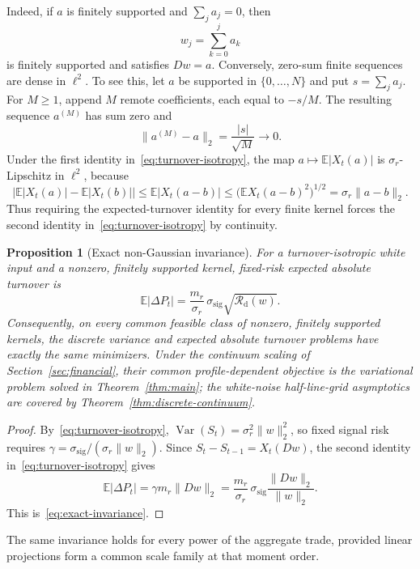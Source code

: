 \documentclass[11pt]{article}
\newtheorem{proposition}[theorem]{Proposition}
\theoremstyle{definition}
\theoremstyle{remark}
\newcommand{\Rcal}{\mathcal R}
\begin{document}
Indeed, if $a$ is finitely supported and $\sum_ja_j=0$, then
\[
 w_j=\sum_{k=0}^j a_k
\]
is finitely supported and satisfies $Dw=a$. Conversely, zero-sum finite
sequences are dense in $\ell^2$. To see this, let $a$ be supported in
$\{0,\dots,N\}$ and put $s=\sum_ja_j$. For $M\geq1$, append $M$ remote
coefficients, each equal to $-s/M$. The resulting sequence $a^{(M)}$ has sum
zero and
\[
 \|a^{(M)}-a\|_2=\frac{|s|}{\sqrt M}\longrightarrow0.
\]
Under the first
identity in~\eqref{eq:turnover-isotropy}, the map
$a\mapsto\mathbb E|X_t(a)|$ is $\sigma_r$-Lipschitz in $\ell^2$, because
\[
 \bigl|\mathbb E|X_t(a)|-\mathbb E|X_t(b)|\bigr|
 \leq\mathbb E|X_t(a-b)|
 \leq\bigl(\mathbb E X_t(a-b)^2\bigr)^{1/2}
 =\sigma_r\|a-b\|_2.
\]
Thus requiring
the expected-turnover identity for every finite kernel forces the second
identity in~\eqref{eq:turnover-isotropy} by continuity.

\begin{proposition}[Exact non-Gaussian invariance]\label{prop:exact-invariance}
For a turnover-isotropic white input and a nonzero, finitely supported kernel,
fixed-risk expected absolute turnover is
\begin{equation}\label{eq:exact-invariance}
 \mathbb E|\Delta P_t|
 =\frac{m_r}{\sigma_r}\,\sigma_{\mathrm{sig}}
     \sqrt{\Rcal_{\mathrm d}(w)}.
\end{equation}
Consequently, on every common feasible class of nonzero, finitely supported
kernels, the discrete variance and expected absolute turnover problems have
exactly the same minimizers. Under the continuum scaling of
Section~\ref{sec:financial},
their common profile-dependent objective is the variational problem solved in
Theorem~\ref{thm:main}; the white-noise
half-line-grid asymptotics are covered by
Theorem~\ref{thm:discrete-continuum}.
\end{proposition}
\begin{proof}
By~\eqref{eq:turnover-isotropy},
$\operatorname{Var}(S_t)=\sigma_r^2\|w\|_2^2$, so fixed signal risk requires
$\gamma=\sigma_{\mathrm{sig}}/(\sigma_r\|w\|_2)$. Since
$S_t-S_{t-1}=X_t(Dw)$, the second identity in~\eqref{eq:turnover-isotropy}
gives
\[
 \mathbb E|\Delta P_t|
 =\gamma m_r\|Dw\|_2
 =\frac{m_r}{\sigma_r}\,\sigma_{\mathrm{sig}}
      \frac{\|Dw\|_2}{\|w\|_2}.
\]
This is~\eqref{eq:exact-invariance}.
\end{proof}

The same invariance holds for every power of the aggregate trade, provided
linear projections form a common scale family at that moment order.
\end{document}
